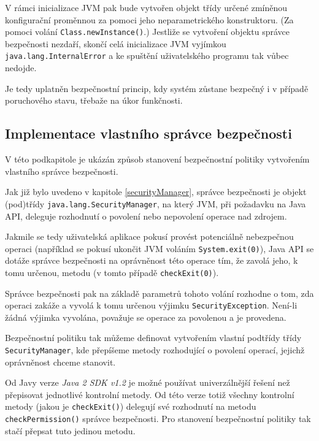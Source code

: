 V rámci inicializace JVM pak bude vytvořen objekt třídy určené zmíněnou konfigurační proměnnou za pomoci jeho neparametrického konstruktoru.
(Za pomoci volání {\tt Class.newInstance()}.) Jestliže se vytvoření objektu správce bezpečnosti nezdaří, skončí celá inicializace
JVM vyjímkou {\tt java.lang.InternalError} a ke spuštění uživatelského programu tak vůbec nedojde.
\cite{sourceLauncher}

Je tedy uplatněn bezpečnostní princip, kdy systém zůstane bezpečný i v případě poruchového stavu, třebaže na úkor funkčnosti.

\subsection{Implementace vlastního správce bezpečnosti} \label{vlastniSM}

V této podkapitole je ukázán způsob stanovení bezpečnostní politiky vytvořením vlastního správce bezpečnosti.

Jak již bylo uvedeno v kapitole \ref{securityManager}, správce bezpečnosti je objekt (pod)třídy {\tt java.lang.SecurityManager},
na který JVM, při požadavku na Java API, deleguje rozhodnutí o povolení nebo nepovolení operace nad zdrojem.

Jakmile se tedy uživatelská aplikace pokusí provést potenciálně nebezpečnou operaci (například se pokusí ukončit JVM voláním {\tt System.exit(0)}),
Java API se dotáže správce bezpečnosti na oprávněnost této operace tím, že zavolá jeho, k tomu určenou, metodu (v tomto případě {\tt checkExit(0)}). \cite[4.1.1]{oaks}

Správce bezpečnosti pak na základě parametrů tohoto volání rozhodne o tom, zda operaci zakáže a vyvolá k tomu určenou výjimku {\tt SecurityException}.
Není-li žádná výjimka vyvolána, považuje se operace za povolenou a je provedena. \cite[4.1.1]{oaks}

Bezpečnostní politiku tak můžeme definovat vytvořením vlastní podtřídy třídy {\tt SecurityManager}, kde přepíšeme metody rozhodující o povolení
operací, jejichž oprávněnost chceme stanovit.

Od Javy verze {\it Java 2 SDK v1.2} je možné používat univerzálnější řešení než přepisovat jednotlivé kontrolní metody.
Od této verze totiž všechny kontrolní metody (jakou je {\tt checkExit()}) delegují své rozhodnutí na metodu {\tt checkPermission()} správce bezpečnosti.
Pro stanovení bezpečnostní politiky tak stačí přepsat tuto jedinou metodu. \cite{refSecurityManager}

